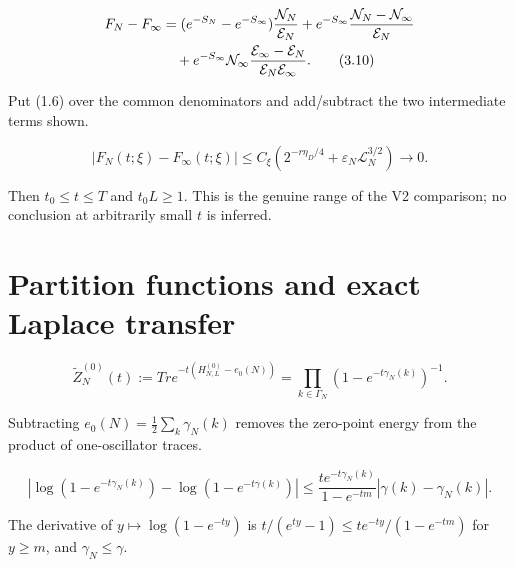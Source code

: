 \documentclass[11pt,a4paper]{article}
\newcommand{\eps}{\varepsilon}
\newcommand{\logN}{\mathcal L_N}
\begin{document}
\QedStep


\begin{align}
 F_N-F_\infty
 &= (e^{-S_N}-e^{-S_\infty})\frac{\mathcal N_N}{\mathcal E_N}
 +e^{-S_\infty}\frac{\mathcal N_N-\mathcal N_\infty}{\mathcal E_N}
 \notag\\
 &\quad+e^{-S_\infty}\mathcal N_\infty
 \frac{\mathcal E_\infty-\mathcal E_N}
 {\mathcal E_N\mathcal E_\infty}.
\tag{3.10}
\end{align}

\Because Put (1.6) over the common denominators and add/subtract the two
intermediate terms shown.

\[
 |F_N(t;\xi)-F_\infty(t;\xi)|
 \le C_\xi(2^{-r\eta_D/4}+\eps_N\logN^{3/2})\to0.
\tag{3.11}
\]


\Because Then $t_0\le t\le T$ and $t_0L\ge1$.  This is the genuine range of
the V2 comparison; no conclusion at arbitrarily small $t$ is inferred.

\QedStep

\section{Partition functions and exact Laplace transfer}


\[
 \widetilde Z_N^{(0)}(t):=Tr e^{-t(H_{N,L}^{(0)}-e_0(N))}
 =\prod_{k\in\Gamma_N}(1-e^{-t\gamma_N(k)})^{-1}.
\tag{4.1}
\]

\Because Subtracting $e_0(N)=\tfrac12\sum_k\gamma_N(k)$ removes the zero-point
energy from the product of one-oscillator traces.

\[
 |\log(1-e^{-t\gamma_N(k)})-
 \log(1-e^{-t\gamma(k)})|
 \le\frac{te^{-t\gamma_N(k)}}{1-e^{-tm}}
 |\gamma(k)-\gamma_N(k)|.
\tag{4.2}
\]

\Because The derivative of $y\mapsto\log(1-e^{-ty})$ is
$t/(e^{ty}-1)\le te^{-ty}/(1-e^{-tm})$ for $y\ge m$, and
$\gamma_N\le\gamma$.
\end{document}
